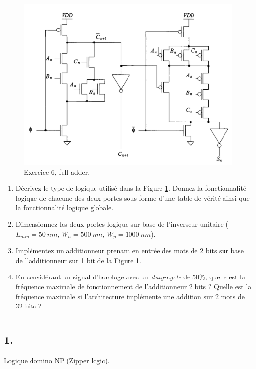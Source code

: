 \documentclass[frenchb,DIV=14]{scrartcl}
\begin{document}
\begin{figure}
	\centering
	\includegraphics[width=13cm]{figures/fig9-3.png}
	\caption{Exercice 6, full adder.}
	\label{fig9-3}
\end{figure}

\begin{enumerate}
	\item Décrivez le type de logique utilisé dans la Figure \ref{fig9-3}.
	Donnez la fonctionnalité logique de chacune des deux portes sous forme d'une
	table de vérité ainsi que la fonctionnalité logique globale.
	\item Dimensionnez les deux portes logique sur base de l'inverseur
    unitaire ($L_{min}=\SI{50}{nm}$, $W_{n}=\SI{500}{nm}$, $W_{p}=\SI{1000}{nm}$).
	\item Implémentez un additionneur prenant en entrée des mots de 2 bits sur
	base de l'additionneur sur 1 bit de la Figure \ref{fig9-3}.
	\item En considérant un signal d'horologe avec un \emph{duty-cycle} de 50\%,
	quelle est la fréquence maximale de fonctionnement de l'additionneur 2 bits ?
	Quelle est la fréquence maximale si l'architecture implémente une addition sur
	2 mots de 32 bits ?
\end{enumerate}

\hspace{1cm}\hrule

\subsection*{1.}

Logique domino NP (Zipper logic).
\end{document}
